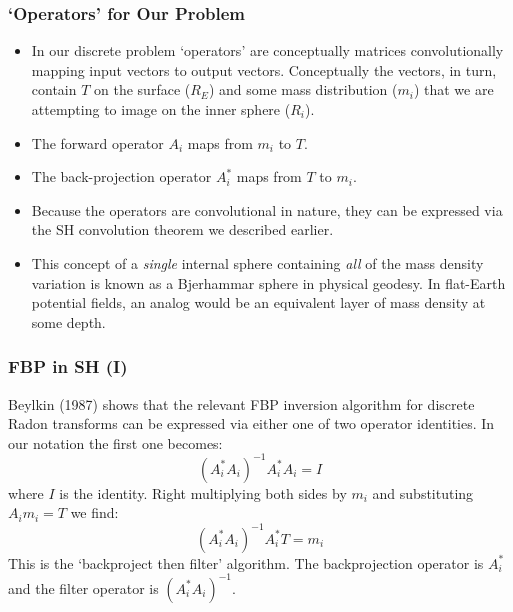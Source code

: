 \documentclass[aspectratio=43,mathserif]{beamer}
\begin{document}
\begin{frame}
\frametitle{`Operators' for Our Problem}

\begin{itemize}

\item In our discrete problem `operators' are conceptually matrices convolutionally mapping input vectors to output vectors. Conceptually the vectors, in turn, contain \(T\) on the surface (\(R_E\)) and some mass distribution (\(m_i\)) that we are attempting to image on the inner sphere (\(R_i\)).

\item The forward operator \(A_i\) maps from \(m_i\) to \(T\). 

\item The back-projection operator \(A_i^*\) maps from \(T\) to \(m_i\).

\item Because the operators are convolutional in nature, they can be expressed via the SH convolution theorem we described earlier.

\item This concept of a \emph{single} internal sphere containing \emph{all} of the mass density variation is known as a Bjerhammar sphere in physical geodesy. In flat-Earth potential fields, an analog would be an equivalent layer of mass density at some depth.


\end{itemize}
\end{frame}

\begin{frame}
\frametitle{FBP in SH (I)}
Beylkin (1987) shows that the relevant FBP inversion algorithm for discrete Radon transforms can be expressed via either one of two operator identities. In our notation the first one becomes:
\[(A_i^* A_i)^{-1}  A_i^* A_i = I\]
where \(I\) is the identity.
Right multiplying both sides by \(m_i\) and substituting \(A_i m_i = T\) we find:
\[(A_i^* A_i)^{-1} A_i^* T= m_i\]
This is the `backproject then filter' algorithm. The backprojection operator is \(A_i^*\) and the filter operator is \((A_i^* A_i)^{-1}\).
\end{frame}
\end{document}
